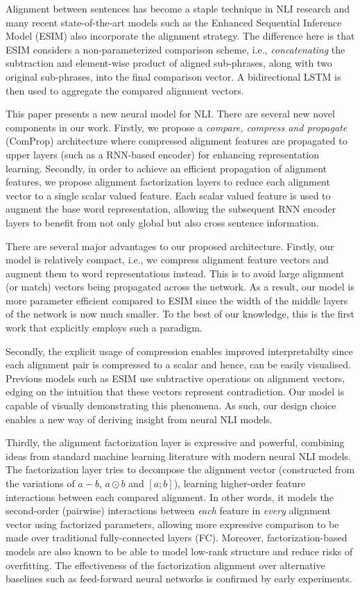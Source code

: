 \documentclass[11pt,a4paper]{article}
\begin{document}
Alignment between sentences has become a staple technique in NLI research and many recent state-of-the-art models such as the Enhanced Sequential Inference Model (ESIM) \cite{DBLP:conf/acl/ChenZLWJI17} also incorporate the alignment strategy. The difference here is that ESIM considers a non-parameterized comparison scheme, i.e., \textit{concatenating} the subtraction and element-wise product of aligned sub-phrases, along with two original sub-phrases, into the final comparison vector. A bidirectional LSTM is then used to aggregate the compared alignment vectors.

This paper presents a new neural model for NLI. There are several new novel components in our work. Firstly, we propose a \textit{compare, compress and propagate} (ComProp) architecture where compressed alignment features are propagated to upper layers (such as a RNN-based encoder) for enhancing representation learning. Secondly, in order to achieve an efficient propagation of alignment features, we propose alignment factorization layers to reduce each alignment vector to a single scalar valued feature. Each scalar valued feature is used to augment the base word representation, allowing the subsequent RNN encoder layers to benefit from not only global but also cross sentence information.

There are several major advantages to our proposed architecture. Firstly, our model is relatively compact, i.e., we compress alignment feature vectors and augment them to word representations instead. This is to avoid large alignment (or match) vectors being propagated across the network. As a result, our model is more parameter efficient compared to ESIM since the width of the middle layers of the network is now much smaller. To the best of our knowledge, this is the first work that explicitly employs such a paradigm.

Secondly, the explicit usage of compression enables improved interpretabilty since each alignment pair is compressed to a scalar and hence, can be easily visualised. Previous models such as ESIM use subtractive operations on alignment vectors, edging on the intuition that these vectors represent contradiction. Our model is capable of visually demonstrating this phenomena. As such, our design choice enables a new way of deriving insight from neural NLI models.

Thirdly, the alignment factorization layer is expressive and powerful, combining ideas from standard machine learning literature \cite{rendle2010factorization} with modern neural NLI models. The factorization layer tries to decompose the alignment vector (constructed from the variations of $a-b$, $a \odot b$ and $[a;b]$), learning higher-order feature interactions between each compared alignment. In other words, it models the second-order (pairwise) interactions between \textit{each} feature in \textit{every} alignment vector using factorized parameters, allowing more expressive comparison to be made over traditional fully-connected layers (FC). Moreover, factorization-based models are also known to be able to model low-rank structure and reduce risks of overfitting. The effectiveness of the factorization alignment over alternative baselines such as feed-forward neural networks is confirmed by early experiments.
\end{document}
